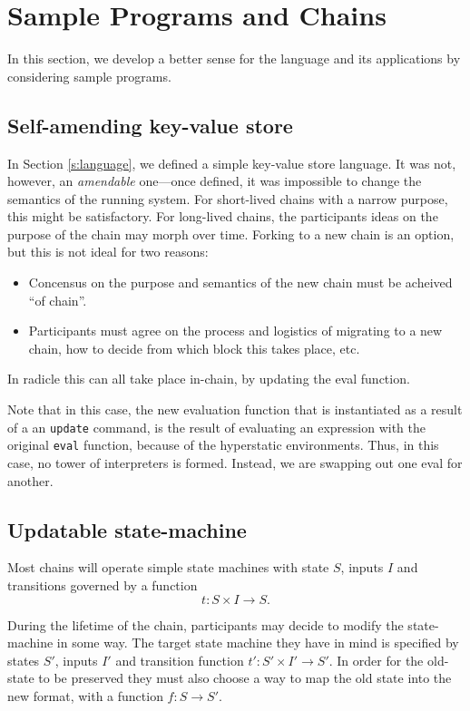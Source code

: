 \section{Sample Programs and Chains}

In this section, we develop a better sense for the language and its
applications by considering sample programs.

\subsection{Self-amending key-value store}

In Section \ref{s:language}, we defined a simple key-value store language. It
was not, however, an \emph{amendable} one---once defined, it was impossible to
change the semantics of the running system. For short-lived chains with a narrow
purpose, this might be satisfactory. For long-lived chains, the participants
ideas on the purpose of the chain may morph over time. Forking to a new chain is
an option, but this is not ideal for two reasons:
\begin{itemize}
  \item Concensus on the purpose and semantics of the new chain must be acheived
    ``of chain''.
  \item Participants must agree on the process and logistics of migrating to a
    new chain, how to decide from which block this takes place, etc.
\end{itemize}
In radicle this can all take place in-chain, by updating the eval function.



Note that in this case, the new evaluation function that is instantiated as a
result of a an \texttt{update} command, is the result of evaluating an
expression with the original \texttt{eval} function, because of the hyperstatic
environments. Thus, in this case, no tower of interpreters is formed. Instead,
we are swapping out one eval for another.

\subsection{Updatable state-machine}

Most chains will operate simple state machines with state $S$, inputs $I$ and
transitions governed by a function
\[
t \colon S \times I \to S.
\]

During the lifetime of the chain, participants may decide to modify the
state-machine in some way. The target state machine they have in mind is
specified by states $S'$, inputs $I'$ and transition function $t' \colon S'
\times I' \to S'$. In order for the old-state to be preserved they must also
choose a way to map the old state into the new format, with a function $f \colon
S \to S'$.

